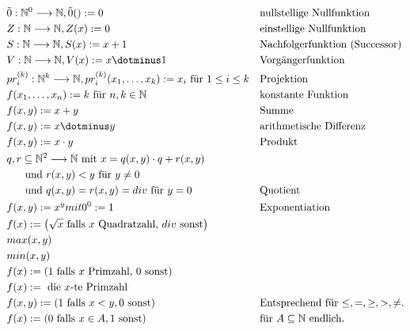 \documentclass[10pt,oneside,a4paper]{scrartcl}
\begin{document}
    \begin{align}
    &\tilde{0} : \mathbb{N}^0\longrightarrow \mathbb{N}, \tilde{0}() := 0
        && \text{nullstellige Nullfunktion}\\
    &Z : \mathbb{N}\longrightarrow \mathbb{N}, Z(x) := 0
        && \text{einstellige Nullfunktion}\\
    &S : \mathbb{N}\longrightarrow \mathbb{N}, S(x) := x+1
        && \text{Nachfolgerfunktion (Successor)}\\
    &V : \mathbb{N}\longrightarrow \mathbb{N}, V(x) := x \dotminus 1
        && \text{Vorgängerfunktion}\\
    &pr_i^{(k)} : \mathbb{N}^k\longrightarrow \mathbb{N},
        pr_i^{(k)}(x_1, \ldots, x_k) := x_i \text{ für $1\leq i\leq k$}
        && \text{Projektion}\\
    &f(x_1, \ldots, x_n) := k \text{ für } n, k \in \mathbb{N}
        && \text{konstante Funktion}\\
    &f(x, y) := x+y && \text{Summe}\\
    &f(x, y) := x \dotminus y && \text{arithmetische Differenz}\\
    &f(x, y) := x \cdot y && \text{Produkt}\\
    &q,r \subseteq\mathbb{N}^2\longrightarrow \mathbb{N}
        \text{ mit } x = q(x, y)\cdot q+r(x, y)\nonumber\\
        &\hspace{5mm}\text{ und } r(x, y) < y \text{ für } y \neq 0\nonumber\\
        &\hspace{5mm}\text{ und } q(x, y) = r(x, y) = div \text{ für } y = 0
        && \text{Quotient}\\
    &f(x, y) := x^y mit 0^0 := 1 && \text{Exponentiation}\\
    &f(x) := \left(\sqrt{x} \text{ falls $x$ Quadratzahl, $div$ sonst}\right)\\
    &max(x, y)\\
    &min(x, y)\\
    &f(x) := \left(1 \text{ falls $x$ Primzahl, $0$ sonst}\right)\\
    &f(x) := \text{ die $x$-te Primzahl}\\
    &f(x, y) := \left(1 \text{ falls $x<y, 0$ sonst}\right)
        && \text{Entsprechend für $\leq, =, \geq, >, \neq$.}\\
    &f(x) := \left(0 \text{ falls $x\in A, 1$ sonst}\right)
        && \text{für }A\subseteq\mathbb{N}\text{ endlich. }\\

\end{align}
\end{document}
